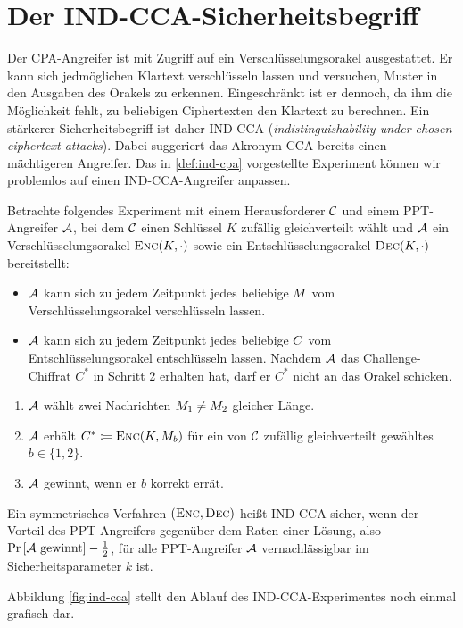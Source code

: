 \section{Der IND-CCA-Sicherheitsbegriff}
Der CPA-Angreifer ist mit Zugriff auf ein Verschlüsselungsorakel ausgestattet. Er kann sich jedmöglichen Klartext verschlüsseln lassen und
versuchen, Muster in den Ausgaben des Orakels zu erkennen. Eingeschränkt ist er dennoch, da ihm die Möglichkeit fehlt, zu beliebigen
Ciphertexten den Klartext zu berechnen. Ein stärkerer Sicherheitsbegriff ist daher IND-CCA (\emph{indistinguishability under chosen-ciphertext attacks}). Dabei suggeriert das Akronym CCA bereits einen mächtigeren Angreifer. Das in \ref{def:ind-cpa} vorgestellte Experiment können wir problemlos auf einen IND-CCA-Angreifer anpassen.

\begin{definition}
	Betrachte folgendes Experiment mit einem Herausforderer $\mathcal{C}$ und einem PPT-Angreifer $\mathcal{A}$, bei dem $\mathcal{C}$ einen Schlüssel $K$ zufällig gleichverteilt wählt und $\mathcal{A}$ ein Verschlüsselungsorakel $\textsc{Enc}(K,\cdot)$ sowie ein Entschlüsselungsorakel $\textsc{Dec}(K,\cdot)$ bereitstellt:
	\begin{itemize}
		\item $\mathcal{A}$ kann sich zu jedem Zeitpunkt jedes beliebige $M$ vom Verschlüsselungsorakel verschlüsseln lassen.
		\item $\mathcal{A}$ kann sich zu jedem Zeitpunkt jedes beliebige
                  $C$ vom Entschlüsselungsorakel entschlüsseln
                  lassen. Nachdem $\mathcal{A}$ das Challenge-Chiffrat $C^*$ in Schritt 2 erhalten hat,
                  darf er $C^*$ nicht an das Orakel schicken.
	\end{itemize}
	\begin{enumerate}
		\item $\mathcal{A}$ wählt zwei Nachrichten $M_1 \neq M_2$ gleicher Länge.
		\item $\mathcal{A}$ erhält $C^{\ast} \coloneqq \textsc{Enc}(K, M_{b})$ für ein von $\mathcal{C}$ zufällig gleichverteilt gewähltes $b \in \{1, 2\}$.
		\item $\mathcal{A}$ gewinnt, wenn er $b$ korrekt errät.
	\end{enumerate}
	Ein symmetrisches Verfahren $(\textsc{Enc}, \textsc{Dec})$ heißt IND-CCA-sicher, wenn der Vorteil des
        PPT-Angreifers gegenüber dem Raten einer Lösung, also $\Pr
        \left[\mathcal{A} \textnormal{ gewinnt} \right] - \frac{1}{2}$, für alle
        PPT-Angreifer $\mathcal{A}$ vernachlässigbar im Sicherheitsparameter $k$ ist. 
\end{definition}
Abbildung \ref{fig:ind-cca} stellt den Ablauf des IND-CCA-Experimentes
noch einmal grafisch dar.

